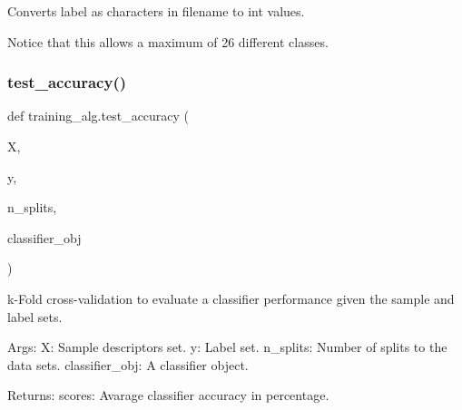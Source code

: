 Converts label as characters in filename to int values.

Notice that this allows a maximum of 26 different classes. \mbox{\label{namespacetraining__alg_aab0eb2ef6247a13da63fd3717fbf7739}} 
\subsubsection{\texorpdfstring{test\+\_\+accuracy()}{test\_accuracy()}}
{\footnotesize\ttfamily def training\+\_\+alg.\+test\+\_\+accuracy (\begin{DoxyParamCaption}\item[{}]{X,  }\item[{}]{y,  }\item[{}]{n\+\_\+splits,  }\item[{}]{classifier\+\_\+obj }\end{DoxyParamCaption})}



k-\/\+Fold cross-\/validation to evaluate a classifier performance given the sample and label sets. 

Args\+: X\+: Sample descriptors set. y\+: Label set. n\+\_\+splits\+: Number of splits to the data sets. classifier\+\_\+obj\+: A classifier object.

Returns\+: scores\+: Avarage classifier accuracy in percentage. 